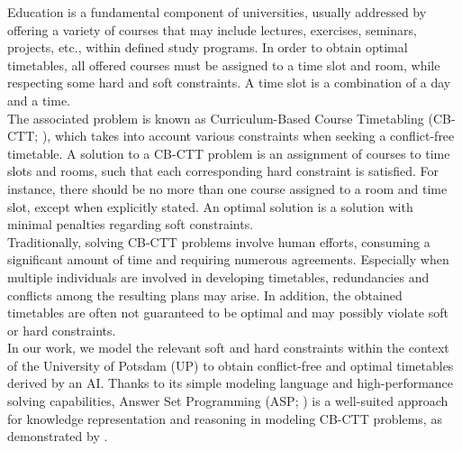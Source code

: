 \documentclass{easychair}
\newcommand{\CBCTT}{CB-CTT}
\newcommand{\UP}{UP}
\newcommand{\ASP}{ASP}
\begin{document}
  Education is a fundamental component of universities, usually addressed by offering a variety of courses that may include lectures, exercises, seminars, projects, etc., within defined study programs. 
  In order to obtain optimal timetables, all offered courses must be assigned to a time slot and room, while respecting some hard and soft constraints. 
  A time slot is a combination of a day and a time. \\
  The associated problem is known as Curriculum-Based Course Timetabling (\CBCTT{}; \cite{becaroto15}), which takes into account various constraints when seeking a conflict-free timetable. 
  A solution to a \CBCTT{} problem is an assignment of courses to time slots and rooms, such that each corresponding hard constraint is satisfied. 
  For instance, there should be no more than one course assigned to a room and time slot, except when explicitly stated.
  An optimal solution is a solution with minimal penalties regarding soft constraints. \\
  Traditionally, solving \CBCTT{} problems involve human efforts, consuming a significant amount of time and requiring numerous agreements.
  Especially when multiple individuals are involved in developing timetables, redundancies and conflicts among the resulting plans may arise.
  In addition, the obtained timetables are often not guaranteed to be optimal and may possibly violate soft or hard constraints. \\
  In our work, we model the relevant soft and hard constraints within the context of the University of Potsdam (\UP{}) to obtain conflict-free and optimal timetables derived by an AI. 
  Thanks to its simple modeling language and high-performance solving capabilities, Answer Set Programming (\ASP{}; \cite{baral02a}) is a well-suited approach for knowledge representation and reasoning in modeling \CBCTT{} problems, as demonstrated by \cite{bainkaokscsotawa18a}.
\end{document}

